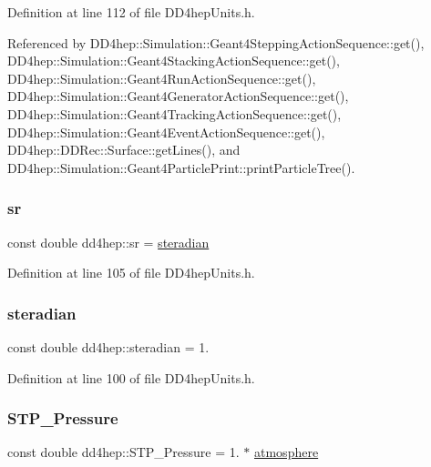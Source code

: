 Definition at line 112 of file D\+D4hep\+Units.\+h.



Referenced by D\+D4hep\+::\+Simulation\+::\+Geant4\+Stepping\+Action\+Sequence\+::get(), D\+D4hep\+::\+Simulation\+::\+Geant4\+Stacking\+Action\+Sequence\+::get(), D\+D4hep\+::\+Simulation\+::\+Geant4\+Run\+Action\+Sequence\+::get(), D\+D4hep\+::\+Simulation\+::\+Geant4\+Generator\+Action\+Sequence\+::get(), D\+D4hep\+::\+Simulation\+::\+Geant4\+Tracking\+Action\+Sequence\+::get(), D\+D4hep\+::\+Simulation\+::\+Geant4\+Event\+Action\+Sequence\+::get(), D\+D4hep\+::\+D\+D\+Rec\+::\+Surface\+::get\+Lines(), and D\+D4hep\+::\+Simulation\+::\+Geant4\+Particle\+Print\+::print\+Particle\+Tree().

\hypertarget{namespacedd4hep_a873790b393da6dc353009c99dfa88b6e}{}\label{namespacedd4hep_a873790b393da6dc353009c99dfa88b6e} 
\subsubsection{\texorpdfstring{sr}{sr}}
{\footnotesize\ttfamily const double dd4hep\+::sr = \hyperlink{namespacedd4hep_a0a902cdeced2ad28da2d32515e540867}{steradian}\hspace{0.3cm}{\ttfamily [static]}}



Definition at line 105 of file D\+D4hep\+Units.\+h.

\hypertarget{namespacedd4hep_a0a902cdeced2ad28da2d32515e540867}{}\label{namespacedd4hep_a0a902cdeced2ad28da2d32515e540867} 
\subsubsection{\texorpdfstring{steradian}{steradian}}
{\footnotesize\ttfamily const double dd4hep\+::steradian = 1.\hspace{0.3cm}{\ttfamily [static]}}



Definition at line 100 of file D\+D4hep\+Units.\+h.

\hypertarget{namespacedd4hep_a9ace4de2d3dba6a0e6f3d0ab29a498aa}{}\label{namespacedd4hep_a9ace4de2d3dba6a0e6f3d0ab29a498aa} 
\subsubsection{\texorpdfstring{S\+T\+P\+\_\+\+Pressure}{STP\_Pressure}}
{\footnotesize\ttfamily const double dd4hep\+::\+S\+T\+P\+\_\+\+Pressure = 1. $\ast$ \hyperlink{namespacedd4hep_a3907dd93dc8fc5b2f3b0fb9b92e46c5b}{atmosphere}\hspace{0.3cm}{\ttfamily [static]}}



